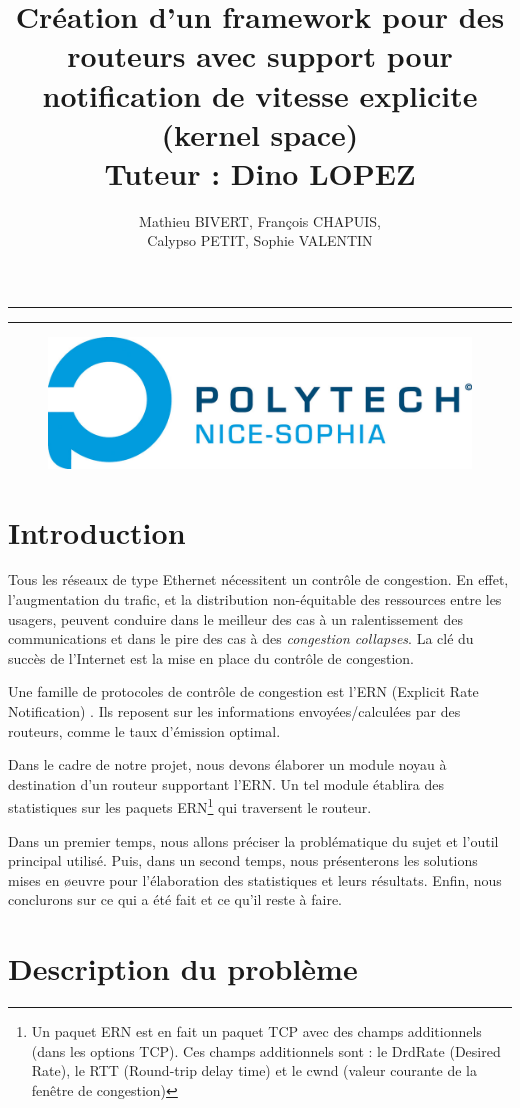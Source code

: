 \documentclass[a4paper]{article}
\title{Création d'un framework pour des routeurs
	avec support pour notification de vitesse explicite
	(kernel space)\\Tuteur : Dino LOPEZ}
\author{Mathieu BIVERT, François CHAPUIS, 
\\Calypso PETIT, Sophie VALENTIN}
\makeatletter
\def\maketitle{%
  \null
  \thispagestyle{empty}%
  \vskip 1cm
  \begin{center}
        \normalfont\large\huge\@author
  \end{center}
  \vfil
  \vfil
  \vfil
  \vfil
  \vfil
  \vfil
  \vfil
  \vfil
  \vfil
  \hrule height 2pt
  \par
  \begin{center}
        \huge \strut \@title \par
        \@date
  \end{center}
  \hrule height 2pt
  \par
  \vfil
  \vfil
  \vfil
  \vfil
  \vfil
  \vfil
  \vfil  
  \vfil  
  \vfil
  \vfil  
  \vfil
  \vfil
  \vfil
  \vfil  
  \vfil  
  \vfil
  \vfil  
  \vfil  
  \vfil
  \vfil
  \vfil
  \vfil
  \vfil
  \vfil
  \vfil
  \null
\begin{figure}[!ht]
        \centering
        \includegraphics[scale=.5]{polytech.png}
\end{figure}
\vfil
\cleardoublepage
}
\makeatother
\begin{document}
\maketitle

\newpage
\tableofcontents

\newpage
\section{Introduction}

Tous les réseaux de type Ethernet nécessitent un contrôle de congestion. En effet,
l'augmentation du trafic, et la distribution non-équitable des ressources 
entre les usagers, peuvent conduire dans le meilleur des cas à un
ralentissement des communications et dans le pire des cas à des \textit{congestion collapses}.
La clé du succès de l'Internet est la mise en place du contrôle de congestion.

Une famille de protocoles de contrôle de congestion est l'ERN
(Explicit Rate Notification) \cite{thesis1}. Ils reposent sur les informations
envoyées/calculées par des routeurs, comme le taux d'émission
optimal. 

Dans le cadre de notre projet, nous devons élaborer un
module noyau à destination d'un routeur supportant l'ERN.
Un tel module établira des statistiques sur les paquets ERN\footnote{Un paquet ERN est en fait 
un paquet TCP avec des champs additionnels (dans les options TCP). Ces champs additionnels sont : 
le DrdRate (Desired Rate), le RTT (Round-trip delay time) et le cwnd (valeur courante de la fenêtre de congestion)}
qui traversent le routeur. 

Dans un premier temps, nous allons préciser
la problématique du sujet et l'outil principal utilisé. Puis, dans un
second temps, nous présenterons les solutions mises en \o euvre pour 
l'élaboration des statistiques et leurs résultats. Enfin, nous conclurons sur ce qui a été fait
et ce qu'il reste à faire.

\section{Description du problème}
\end{document}
